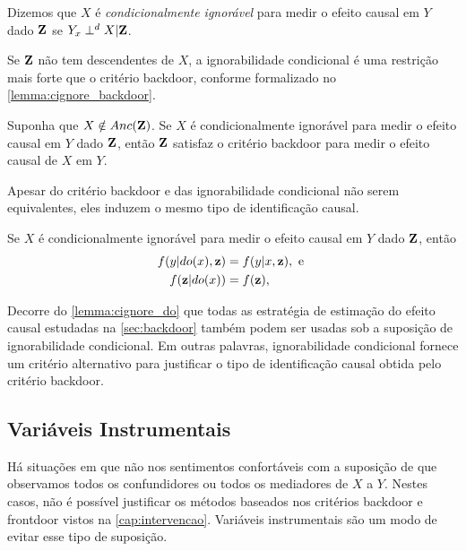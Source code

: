 \begin{definition}
 \label{def:cignore}
 Dizemos que $X$ é \textit{condicionalmente ignorável} para
 medir o efeito causal em $Y$ dado ${\mathbf{Z}}$ se
 $Y_x \perp^d X | {\mathbf{Z}}$.
\end{definition}

Se ${\mathbf{Z}}$ não tem descendentes de $X$, 
a ignorabilidade condicional é
uma restrição mais forte que o critério backdoor,
conforme formalizado no \cref{lemma:cignore_backdoor}.

\begin{lemma}
 \label{lemma:cignore_backdoor}
 Suponha que $X \notin Anc({\mathbf{Z}})$.
 Se $X$ é condicionalmente ignorável para 
 medir o efeito causal em $Y$ dado ${\mathbf{Z}}$, então
 ${\mathbf{Z}}$ satisfaz o critério backdoor para
 medir o efeito causal de $X$ em $Y$.
\end{lemma}

Apesar do critério backdoor e
das ignorabilidade condicional não serem equivalentes,
eles induzem o mesmo tipo de identificação causal.

\begin{lemma}
 \label{lemma:cignore_do}
 Se $X$ é condicionalmente ignorável para 
 medir o efeito causal em $Y$ dado ${\mathbf{Z}}$, então
 \begin{align*}
  f(y|do(x),{\mathbf{z}}) &= f(y|x,{\mathbf{z}}), \text{ e } \\
  f({\mathbf{z}}|do(x)) &= f({\mathbf{z}}),
 \end{align*}
\end{lemma}

Decorre do \cref{lemma:cignore_do} que
todas as estratégia de estimação do efeito causal
estudadas na \cref{sec:backdoor} também
podem ser usadas sob 
a suposição de ignorabilidade condicional.
Em outras palavras, 
ignorabilidade condicional fornece 
um critério alternativo para
justificar o tipo de identificação causal
obtida pelo critério backdoor. 

\subsection{Variáveis Instrumentais}
\label{sec:instrument}

Há situações em que 
não nos sentimentos confortáveis com
a suposição de que observamos
todos os confundidores ou
todos os mediadores de $X$ a $Y$.
Nestes casos, não é possível
justificar os métodos baseados
nos critérios backdoor e frontdoor
vistos na \cref{cap:intervencao}.
Variáveis instrumentais são 
um modo de evitar esse tipo de suposição.

